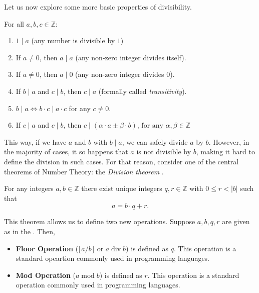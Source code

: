 \documentclass[../lecture-notes-148x210.tex]{subfiles}
\begin{document}
Let us now explore some more basic properties of divisibility. 

\begin{lemma}
    For all $a, b, c \in \mathbb{Z}$:
    \hfill
    \begin{enumerate}
        \item $1 \mid a$ (any number is divisible by $1$)
        \item If $a \neq 0$, then $a \mid a$ (any non-zero integer divides itself).
        \item If $a \neq 0$, then $a \mid 0$ (any non-zero integer divides $0$).
        \item If $b \mid a$ and $c \mid b$, then $c \mid a$ (formally called \emph{transitivity}).
        \item $b \mid a \iff b \cdot c \mid a \cdot c$ for any $c \neq 0$.
        \item If $c \mid a$ and $c \mid b$, then $c \mid (\alpha \cdot a \pm \beta \cdot b)$, $\text{for any } \alpha, \beta \in \mathbb{Z}$
    \end{enumerate}
\end{lemma}

This way, if we have $a$ and $b$ with $b \mid a$, we can safely divide $a$ by
$b$. However, in the majority of cases, it so happens that $a$ is not divisible
by $b$, making it hard to define the division in such cases. For that reason,
consider one of the central theorems of Number Theory: the \emph{Division
theorem} \cite[section 2]{Judson_2012}.

\begin{theorem}\label{th:division}
    For any integers $a,b \in \mathbb{Z}$ there exist unique integers $q, r \in \mathbb{Z}$ with $0 \leq r < |b|$ such that 
    \begin{equation*}
        a = b \cdot q + r.
    \end{equation*}
\end{theorem}

This theorem allows us to define two new operations. Suppose $a,b,q,r$ are given
as in the . Then,
\begin{itemize}
    \item \textbf{Floor Operation} ($\lfloor a/b \rfloor$ or $a \; \text{div} \; b$) is defined
    as $q$. This operation is a standard  opeartion commonly used in programming languages.
    \item \textbf{Mod Operation} ($a \; \text{mod} \; b$) is defined as $r$. This operation is a standard
 operation commonly used in programming languages. 
\end{itemize}
\end{document}
